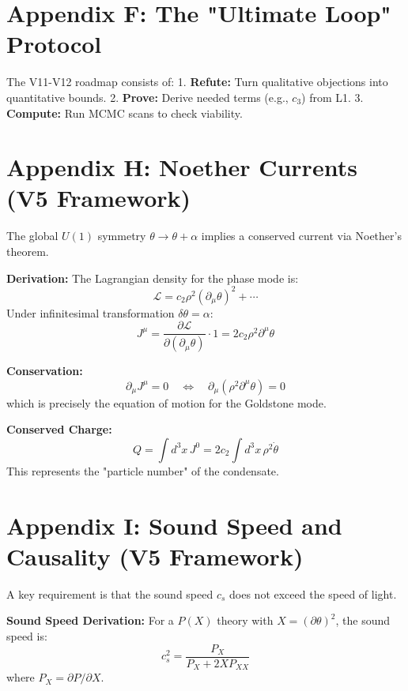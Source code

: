 \documentclass[a4paper,12pt]{article}
\begin{document}
\section{Appendix F: The "Ultimate Loop" Protocol}
The V11-V12 roadmap consists of:
1. \textbf{Refute:} Turn qualitative objections into quantitative bounds.
2. \textbf{Prove:} Derive needed terms (e.g., $c_3$) from L1.
3. \textbf{Compute:} Run MCMC scans to check viability.

\section{Appendix H: Noether Currents (V5 Framework)}
The global $U(1)$ symmetry $\theta \to \theta + \alpha$ implies a conserved current via Noether's theorem.

\textbf{Derivation:}
The Lagrangian density for the phase mode is:
\begin{equation}
    \mathcal{L} = c_2 \rho^2 (\partial_\mu \theta)^2 + \cdots
\end{equation}
Under infinitesimal transformation $\delta\theta = \alpha$:
\begin{equation}
    J^\mu = \frac{\partial \mathcal{L}}{\partial(\partial_\mu \theta)} \cdot 1 = 2c_2 \rho^2 \partial^\mu \theta
\end{equation}

\textbf{Conservation:}
\begin{equation}
    \partial_\mu J^\mu = 0 \quad \Leftrightarrow \quad \partial_\mu(\rho^2 \partial^\mu \theta) = 0
\end{equation}
which is precisely the equation of motion for the Goldstone mode.

\textbf{Conserved Charge:}
\begin{equation}
    Q = \int d^3x \, J^0 = 2c_2 \int d^3x \, \rho^2 \dot{\theta}
\end{equation}
This represents the "particle number" of the condensate.

\section{Appendix I: Sound Speed and Causality (V5 Framework)}
A key requirement is that the sound speed $c_s$ does not exceed the speed of light.

\textbf{Sound Speed Derivation:}
For a $P(X)$ theory with $X = (\partial\theta)^2$, the sound speed is:
\begin{equation}
    c_s^2 = \frac{P_X}{P_X + 2X P_{XX}}
\end{equation}
where $P_X = \partial P / \partial X$.
\end{document}

